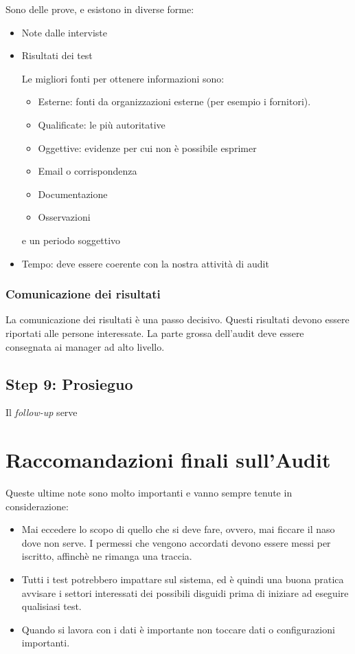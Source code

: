 Sono delle prove, e esistono in diverse forme:
\begin{itemize}
\item Note dalle interviste
\item Risultati dei test

Le migliori fonti per ottenere informazioni sono:
\begin{itemize}
\item Esterne: fonti da organizzazioni esterne (per esempio i fornitori).
\item Qualificate: le più autoritative
\item Oggettive: evidenze per cui non è possibile esprimer
\item Email o corrispondenza
\item Documentazione
\item Osservazioni
\end{itemize}e un periodo soggettivo
\item Tempo: deve essere coerente con la nostra attività di audit 
\end{itemize}



\subsubsection{Comunicazione dei risultati}

La comunicazione dei risultati è una passo decisivo. Questi risultati devono essere riportati alle persone interessate.
La parte grossa dell'audit deve essere consegnata ai manager ad alto livello.


\subsection{Step 9: Prosieguo}


Il \textit{follow-up} serve 

\section{Raccomandazioni finali sull'Audit}

Queste ultime note sono molto importanti e vanno sempre tenute in considerazione:
\begin{itemize}
\item Mai eccedere lo scopo di quello che si deve fare, ovvero, mai ficcare il naso dove non serve. I permessi che vengono accordati devono essere messi per iscritto, affinchè ne rimanga una traccia.
\item Tutti i test potrebbero impattare sul sistema, ed è quindi una buona pratica avvisare i settori interessati dei possibili disguidi prima di iniziare ad eseguire qualisiasi test.
\item Quando si lavora con i dati è importante non toccare dati o configurazioni importanti.
\end{itemize}


